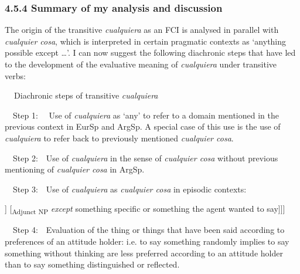 \subsubsection[4.5.4 Summary of my analysis and discussion]{\textbf{4.5.4 }\textbf{Summary of my analysis and discussion}}
\begin{styleStandard}
The origin of the transitive \textit{cualquiera }as an FCI is analysed\textit{ }in parallel with\textit{ cualquier cosa},\textit{ }which is interpreted in certain pragmatic contexts as ‘anything possible except …’. I can now suggest the following diachronic steps that have led to the development of the evaluative meaning of \textit{cualquiera} under transitive verbs:
\end{styleStandard}

\begin{styleStandard}
\textbf{\ \ }Diachronic steps of transitive\textit{ cualquiera}
\end{styleStandard}

\begin{styleStandard}
\ \ Step 1: \ \ Use of \textit{cualquiera} as ‘any’ to refer to a domain mentioned in the previous context in EurSp and ArgSp. A special case of this use is the use of \textit{cualquiera} to refer back to previously mentioned \textit{cualquier cosa}.
\end{styleStandard}

\begin{styleStandard}
\ \ Step 2:\ \ Use of \textit{cualquiera} in the sense of \textit{cualquier cosa} without previous mentioning of \textit{cualquier cosa} in ArgSp.
\end{styleStandard}

\begin{styleStandard}
\ \ Step 3:\ \ Use of \textit{cualquiera} as \textit{cualquier cosa} in episodic contexts: 
\end{styleStandard}

\begin{styleStandard}
[\textsubscript{VP} \textit{decir/mandar}[episodic] [\textsubscript{DP} \textit{cualquiera=cualquier cosa}]] [\textsubscript{Adjunct NP} \textit{except} something specific or something the agent wanted to say]]]
\end{styleStandard}

\begin{styleStandard}
\ \ Step 4:\ \ Evaluation of the thing or things that have been said according to preferences of an attitude holder: i.e. to say something randomly implies to say something without thinking are less preferred according to an attitude holder than to say something distinguished or reflected.
\end{styleStandard}

